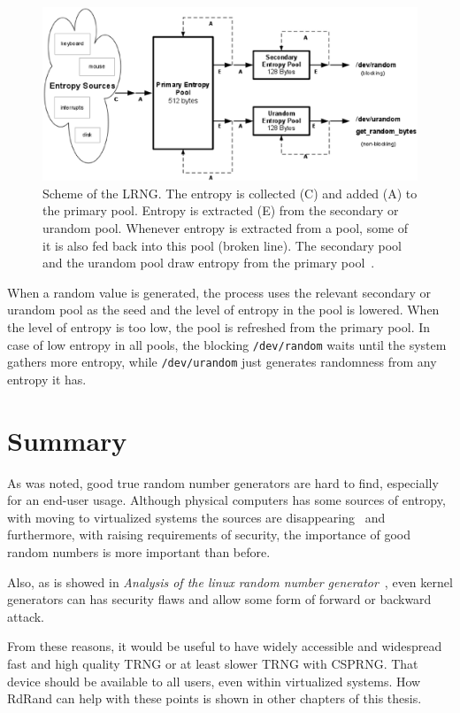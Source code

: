 \begin{figure}[h!]
  \centering
 \includegraphics[width=16cm,keepaspectratio]{fig/LRNG} %
\caption{Scheme of the LRNG. The entropy is collected (C) and added (A) to the primary pool. Entropy is extracted (E) from the secondary or urandom pool. Whenever entropy is extracted from a pool, some of it is also fed back into this pool (broken line). The secondary pool and the urandom pool draw entropy from the primary pool~\cite{AnalysisOfLinuxRNG}.}
\label{fig:LRNG}
\end{figure}

When a random value is generated, the process uses the relevant secondary or urandom pool as the seed and the level of entropy in the pool is lowered. When the level of entropy is too low, the pool is refreshed from the primary pool. In case of low entropy in all pools, the blocking {\tt /dev/random} waits until the system gathers more entropy, while {\tt /dev/urandom} just generates randomness from any entropy it has.

\section{Summary}
As was noted, good true random number generators are hard to find, especially for an end-user usage. Although physical computers has some sources of entropy, with moving to virtualized systems the sources are disappearing~\cite{AnalysisOfEntropyLevels} and furthermore, with raising requirements of security, the importance of good random numbers is more important than before.

Also, as is showed in {\em Analysis of the linux random number generator}~\cite{AnalysisOfLinuxRNG}, even kernel generators can has security flaws and allow some form of forward or backward attack. 

From these reasons, it would be useful to have widely accessible and widespread fast and high quality TRNG or at least slower TRNG with CSPRNG. That device should be available to all users, even within virtualized systems. How RdRand can help with these points is shown in other chapters of this thesis.